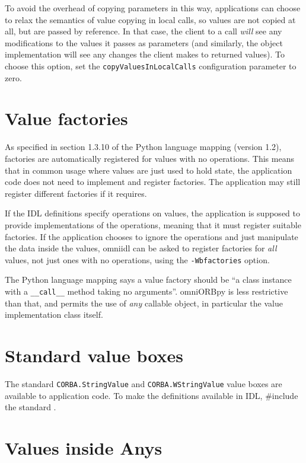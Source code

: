 \documentclass[11pt,oneside,a4paper]{book}
\newcommand{\type}[1]{\texttt{#1}}
\newcommand{\code}[1]{\texttt{#1}}
\newcommand{\cmdline}[1]{\texttt{#1}}
\begin{document}
To avoid the overhead of copying parameters in this way, applications
can choose to relax the semantics of value copying in local calls, so
values are not copied at all, but are passed by reference. In that
case, the client to a call \emph{will} see any modifications to the
values it passes as parameters (and similarly, the object
implementation will see any changes the client makes to returned
values). To choose this option, set the \code{copyValuesInLocalCalls}
configuration parameter to zero.


\section{Value factories}

As specified in section 1.3.10 of the Python language mapping (version
1.2), factories are automatically registered for values with no
operations. This means that in common usage where values are just used
to hold state, the application code does not need to implement and
register factories. The application may still register different
factories if it requires.

If the IDL definitions specify operations on values, the application
is supposed to provide implementations of the operations, meaning that
it must register suitable factories. If the application chooses to
ignore the operations and just manipulate the data inside the values,
omniidl can be asked to register factories for \emph{all} values, not
just ones with no operations, using the \cmdline{-Wbfactories} option.

The Python language mapping says a value factory should be ``a class
instance with a \code{\_\_call\_\_} method taking no arguments''.
omniORBpy is less restrictive than that, and permits the use of
\emph{any} callable object, in particular the value implementation
class itself.



\section{Standard value boxes}

The standard \type{CORBA.StringValue} and \type{CORBA.WStringValue}
value boxes are available to application code. To make the definitions
available in IDL, \#include the standard .


\section{Values inside Anys}
\end{document}
